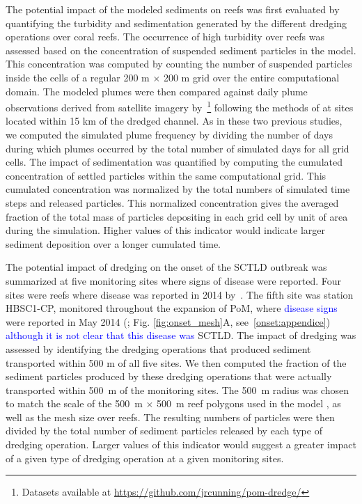 \documentclass[preprint,12pt,authoryear]{elsarticle}
\newcommand{\modif}[1]{\textcolor{blue}{#1}}
\begin{document}
The potential impact of the modeled sediments on reefs was first evaluated by quantifying the turbidity and sedimentation generated by the different dredging operations over coral reefs. The occurrence of high turbidity over reefs was assessed based on the concentration of suspended sediment particles in the model. This concentration was computed by counting the number of suspended particles inside the cells of a regular 200 m $\times$ 200 m grid over the entire computational domain. The modeled plumes were then compared against daily plume observations derived from satellite imagery by~\cite{cunning2019extensive}\footnote{Datasets available at \url{https://github.com/jrcunning/pom-dredge/}} following the methods of \cite{barnes2015sediment} at sites located within 15 km of the dredged channel. As in these two previous studies, we computed  the simulated plume frequency by dividing the number of days during which plumes occurred by the total number of simulated days for all grid cells. The impact of sedimentation was quantified by computing the cumulated concentration of settled particles within the same computational grid. This cumulated concentration was normalized by the total numbers of simulated time steps and released particles. This normalized concentration gives the averaged fraction of the total mass of particles depositing in each grid cell by unit of area during the simulation. Higher values of this indicator would indicate larger sediment deposition over a longer cumulated time.

The potential impact of dredging on the onset of the SCTLD outbreak was summarized at five monitoring sites where signs of disease were reported. Four sites were reefs where disease was reported in 2014 by~\cite{precht2016unprecedented}. The fifth site was station HBSC1-CP, monitored throughout the expansion of PoM, where \modif{disease signs} were reported in May 2014 (\citealp{dial2017}; Fig. \ref{fig:onset_mesh}A, see~\ref{onset:appendice}) \modif{although it is not clear that this disease was} SCTLD. The impact of dredging was assessed by identifying the dredging operations that produced sediment transported within 500 m of all five sites. We then computed the fraction of the sediment particles produced by these dredging operations that were actually transported within 500~m of the monitoring sites. The 500~m radius was chosen to match the scale of the 500~m $\times$ 500~m reef polygons used in the model \citep{dobbelaere2020coupled}, as well as the mesh size over reefs. The resulting numbers of particles were then divided by the total number of sediment particles released by each type of dredging operation. Larger values of this indicator would suggest a greater impact of a given type of dredging operation at a given monitoring sites.
\end{document}
